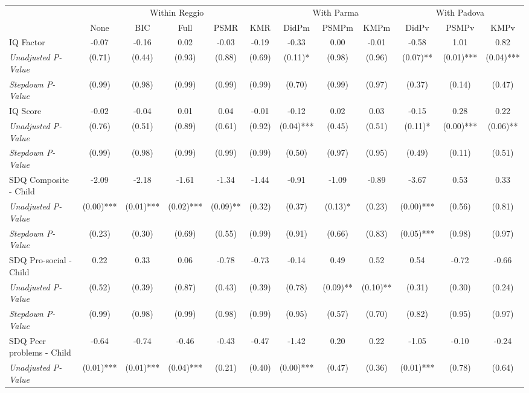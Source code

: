 \begin{tabular}{l c c c c c c c c c c c}
\toprule
& \multicolumn{5}{c}{Within Reggio} & \multicolumn{3}{c}{With Parma} & \multicolumn{3}{c}{With Padova} \\\cmidrule(lr){2-6} \cmidrule(lr){7-9} \cmidrule(lr){10-12}
 & None & BIC & Full & PSMR & KMR & DidPm & PSMPm & KMPm & DidPv & PSMPv & KMPv \\
\midrule
IQ Factor & -0.07 & -0.16 & 0.02 & -0.03 & -0.19 & -0.33 & 0.00 & -0.01 & -0.58 & 1.01 & 0.82 \\
\quad \textit{Unadjusted P-Value} & (0.71) & (0.44) & (0.93) & (0.88) & (0.69) & (0.11)* & (0.98) & (0.96) & (0.07)** & (0.01)*** & (0.04)*** \\
\quad \textit{Stepdown P-Value} & (0.99) & (0.98) & (0.99) & (0.99) & (0.99) & (0.70) & (0.99) & (0.97) & (0.37) & (0.14) & (0.47) \\
IQ Score & -0.02 & -0.04 & 0.01 & 0.04 & -0.01 & -0.12 & 0.02 & 0.03 & -0.15 & 0.28 & 0.22 \\
\quad \textit{Unadjusted P-Value} & (0.76) & (0.51) & (0.89) & (0.61) & (0.92) & (0.04)*** & (0.45) & (0.51) & (0.11)* & (0.00)*** & (0.06)** \\
\quad \textit{Stepdown P-Value} & (0.99) & (0.98) & (0.99) & (0.99) & (0.99) & (0.50) & (0.97) & (0.95) & (0.49) & (0.11) & (0.51) \\
SDQ Composite - Child & -2.09 & -2.18 & -1.61 & -1.34 & -1.44 & -0.91 & -1.09 & -0.89 & -3.67 & 0.53 & 0.33 \\
\quad \textit{Unadjusted P-Value} & (0.00)*** & (0.01)*** & (0.02)*** & (0.09)** & (0.32) & (0.37) & (0.13)* & (0.23) & (0.00)*** & (0.56) & (0.81) \\
\quad \textit{Stepdown P-Value} & (0.23) & (0.30) & (0.69) & (0.55) & (0.99) & (0.91) & (0.66) & (0.83) & (0.05)*** & (0.98) & (0.97) \\
SDQ Pro-social - Child & 0.22 & 0.33 & 0.06 & -0.78 & -0.73 & -0.14 & 0.49 & 0.52 & 0.54 & -0.72 & -0.66 \\
\quad \textit{Unadjusted P-Value} & (0.52) & (0.39) & (0.87) & (0.43) & (0.39) & (0.78) & (0.09)** & (0.10)** & (0.31) & (0.30) & (0.24) \\
\quad \textit{Stepdown P-Value} & (0.99) & (0.98) & (0.99) & (0.98) & (0.99) & (0.95) & (0.57) & (0.70) & (0.82) & (0.95) & (0.97) \\
SDQ Peer problems - Child & -0.64 & -0.74 & -0.46 & -0.43 & -0.47 & -1.42 & 0.20 & 0.22 & -1.05 & -0.10 & -0.24 \\
\quad \textit{Unadjusted P-Value} & (0.01)*** & (0.01)*** & (0.04)*** & (0.21) & (0.40) & (0.00)*** & (0.47) & (0.36) & (0.01)*** & (0.78) & (0.64) \\

\end{tabular}
